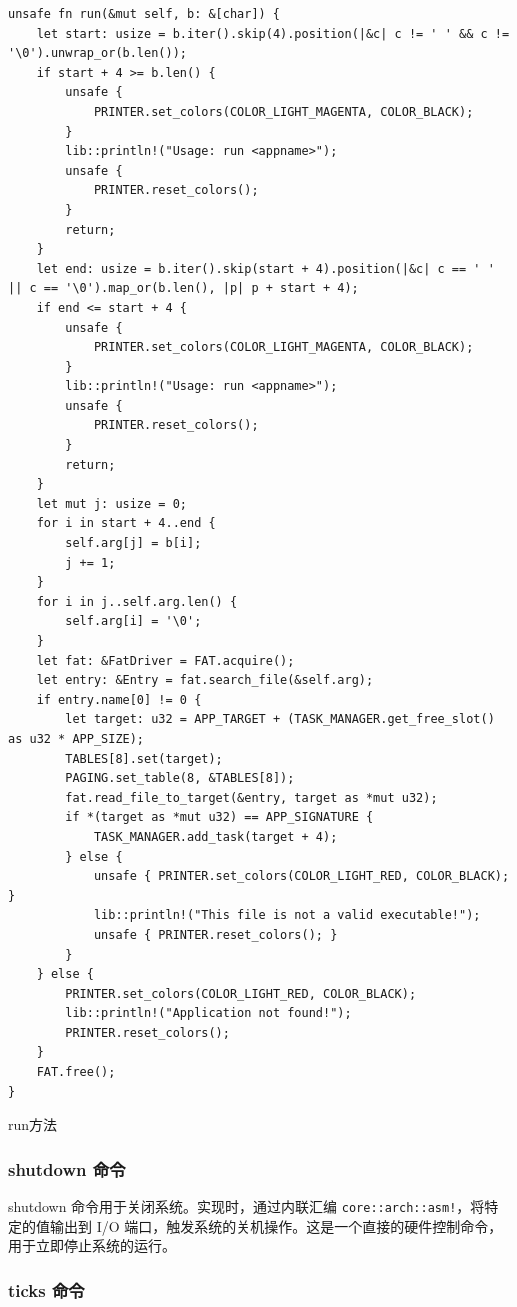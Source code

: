 \begin{listing}[htbp]
    \begin{verbatim}
unsafe fn run(&mut self, b: &[char]) {
    let start: usize = b.iter().skip(4).position(|&c| c != ' ' && c != '\0').unwrap_or(b.len());
    if start + 4 >= b.len() {
        unsafe {
            PRINTER.set_colors(COLOR_LIGHT_MAGENTA, COLOR_BLACK);
        }
        lib::println!("Usage: run <appname>");
        unsafe {
            PRINTER.reset_colors();
        }
        return;
    }
    let end: usize = b.iter().skip(start + 4).position(|&c| c == ' ' || c == '\0').map_or(b.len(), |p| p + start + 4);
    if end <= start + 4 {
        unsafe {
            PRINTER.set_colors(COLOR_LIGHT_MAGENTA, COLOR_BLACK);
        }
        lib::println!("Usage: run <appname>");
        unsafe {
            PRINTER.reset_colors();
        }
        return;
    }
    let mut j: usize = 0;
    for i in start + 4..end {
        self.arg[j] = b[i];
        j += 1;
    }
    for i in j..self.arg.len() {
        self.arg[i] = '\0';
    }
    let fat: &FatDriver = FAT.acquire();
    let entry: &Entry = fat.search_file(&self.arg);
    if entry.name[0] != 0 {
        let target: u32 = APP_TARGET + (TASK_MANAGER.get_free_slot() as u32 * APP_SIZE);
        TABLES[8].set(target);
        PAGING.set_table(8, &TABLES[8]);
        fat.read_file_to_target(&entry, target as *mut u32);
        if *(target as *mut u32) == APP_SIGNATURE {
            TASK_MANAGER.add_task(target + 4);
        } else {
            unsafe { PRINTER.set_colors(COLOR_LIGHT_RED, COLOR_BLACK); }
            lib::println!("This file is not a valid executable!");
            unsafe { PRINTER.reset_colors(); }
        }
    } else {
        PRINTER.set_colors(COLOR_LIGHT_RED, COLOR_BLACK);
        lib::println!("Application not found!");
        PRINTER.reset_colors();
    }
    FAT.free();
}
    \end{verbatim}
    \caption{run方法}\label{lst:RunMethod}
\end{listing}

\subsubsection{shutdown 命令}

shutdown 命令用于关闭系统。实现时，通过内联汇编 \texttt{core::arch::asm!}，将特定的值输出到 I/O 端口，触发系统的关机操作。这是一个直接的硬件控制命令，用于立即停止系统的运行。

\subsubsection{ticks 命令}

